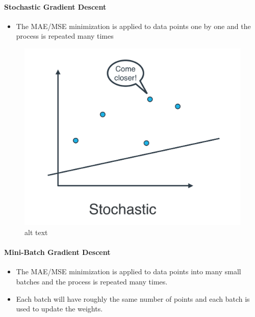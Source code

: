 \documentclass[11pt]{article}
\makeatletter
\def\maxwidth{\ifdim\Gin@nat@width>\linewidth\linewidth
    \else\Gin@nat@width\fi}
\let\Oldincludegraphics\includegraphics
\renewcommand{\includegraphics}[1]{\Oldincludegraphics[width=.8\maxwidth]{#1}}
\providecommand{\tightlist}{%
      \setlength{\itemsep}{0pt}\setlength{\parskip}{0pt}}
\makeatother
\begin{document}
    \hypertarget{stochastic-gradient-descent}{%
\paragraph{Stochastic Gradient
Descent}\label{stochastic-gradient-descent}}

\begin{itemize}
\tightlist
\item
  The MAE/MSE minimization is applied to data points one by one and the
  process is repeated many times
\end{itemize}

\begin{figure}
\centering
\includegraphics{stochastic.png}
\caption{alt text}
\end{figure}

    \hypertarget{mini-batch-gradient-descent}{%
\paragraph{Mini-Batch Gradient
Descent}\label{mini-batch-gradient-descent}}

\begin{itemize}
\tightlist
\item
  The MAE/MSE minimization is applied to data points into many small
  batches and the process is repeated many times.
\item
  Each batch will have roughly the same number of points and each batch
  is used to update the weights.
\end{itemize}
\end{document}
